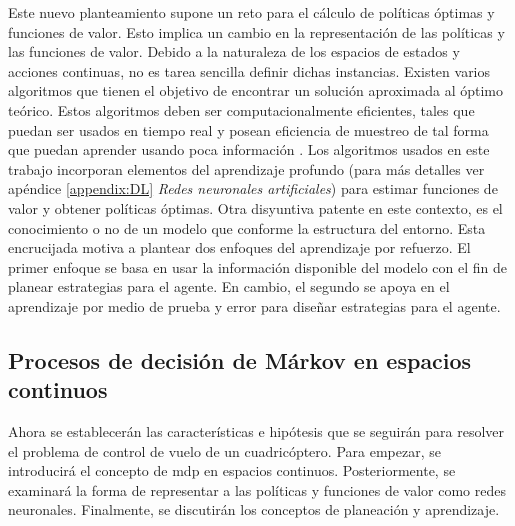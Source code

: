Este nuevo planteamiento supone un reto para el cálculo de políticas óptimas y funciones de valor. Esto implica un cambio en la representación de las políticas y las funciones de valor. Debido a la naturaleza de los espacios de estados y acciones continuas, no es tarea sencilla definir dichas instancias. Existen varios algoritmos que tienen el objetivo de encontrar un solución aproximada al óptimo teórico. Estos algoritmos deben ser computacionalmente eficientes, tales que puedan ser usados en tiempo real y posean eficiencia de muestreo de tal forma que puedan aprender usando poca información \cite{wiering2011}. Los algoritmos usados en este trabajo incorporan elementos del aprendizaje profundo (para más detalles ver apéndice \ref{appendix:DL} \textit{Redes neuronales artificiales}) para estimar funciones de valor y obtener políticas óptimas. Otra disyuntiva patente en este contexto, es el conocimiento o no de un modelo que conforme la estructura del entorno. Esta encrucijada motiva a plantear dos enfoques del aprendizaje por refuerzo. El primer enfoque se basa en usar la información disponible del modelo con el fin de planear estrategias para el agente. En cambio, el segundo se apoya en el aprendizaje por medio de prueba y error para diseñar estrategias para el agente.

\subsection{Procesos de decisión de Márkov en espacios continuos}

Ahora se establecerán las características e hipótesis que se seguirán para resolver el problema de control de vuelo de un cuadricóptero. Para empezar, se introducirá el concepto de \acrshort{mdp} en espacios continuos. Posteriormente, se examinará la forma de representar a las políticas y funciones de valor como redes neuronales. Finalmente, se discutirán los conceptos de planeación y aprendizaje.

